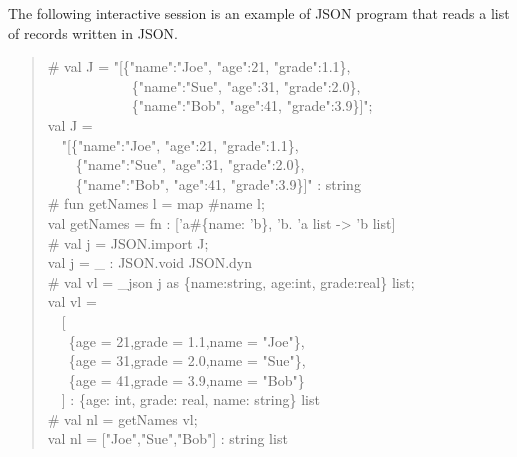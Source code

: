 \documentclass{jbook}
\newenvironment{program}{\begin{quote}\begin{tt}}%
                        {\end{tt}\end{quote}}
\begin{document}
\else%
	The following interactive session is an example of JSON
program that reads a list of records written in JSON.
\begin{program}
\# val J = "[\{"name":"Joe", "age":21, "grade":1.1\},\ \\
\ \ \ \ \ \ \ \ \ \ \ \ \{"name":"Sue", "age":31, "grade":2.0\},\ \\
\ \ \ \ \ \ \ \ \ \ \ \ \{"name":"Bob", "age":41, "grade":3.9\}]";\\
val J =\\
\ \ "[\{"name":"Joe", "age":21, "grade":1.1\},\\
\ \ \ \ \{"name":"Sue", "age":31, "grade":2.0\},\\
\ \ \ \ \{"name":"Bob", "age":41, "grade":3.9\}]" : string\\
\# fun getNames l = map \#name l;\\
val getNames = fn : ['a\#\{name: 'b\}, 'b. 'a list -> 'b list]\\
\# val j = JSON.import J;\\
val j = \_ : JSON.void JSON.dyn\\
\# val vl = \_json j as \{name:string, age:int, grade:real\} list;\\
val vl =\\
\ \ [\\
\ \ \ \{age = 21,grade = 1.1,name = "Joe"\},\\
\ \ \ \{age = 31,grade = 2.0,name = "Sue"\},\\
\ \ \ \{age = 41,grade = 3.9,name = "Bob"\}\\
\ \ ] : \{age: int, grade: real, name: string\} list\\
\# val nl = getNames vl;\\
val nl = ["Joe","Sue","Bob"] : string list
\end{program}
\end{document}
